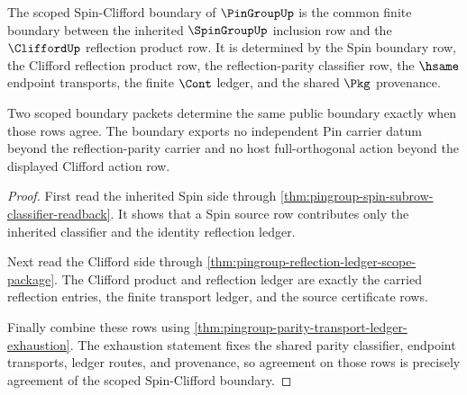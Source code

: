 \begin{theorem}
\label{thm:pingroup-scoped-spin-clifford-boundary}
The scoped Spin-Clifford boundary of $\PinGroupUp$ is the common finite
boundary between the inherited $\SpinGroupUp$ inclusion row and the
$\CliffordUp$ reflection product row. It is determined by the Spin boundary
row, the Clifford reflection product row, the reflection-parity classifier row,
the $\hsame$ endpoint transports, the finite $\Cont$ ledger, and the shared
$\Pkg$ provenance.

Two scoped boundary packets determine the same public boundary exactly when
those rows agree. The boundary exports no independent Pin carrier datum beyond
the reflection-parity carrier and no host full-orthogonal action beyond the
displayed Clifford action row.
\end{theorem}
\begin{proof}
First read the inherited Spin side through
\autoref{thm:pingroup-spin-subrow-classifier-readback}. It shows that a Spin
source row contributes only the inherited classifier and the identity
reflection ledger.

Next read the Clifford side through
\autoref{thm:pingroup-reflection-ledger-scope-package}. The Clifford product
and reflection ledger are exactly the carried reflection entries, the finite
transport ledger, and the source certificate rows.

Finally combine these rows using
\autoref{thm:pingroup-parity-transport-ledger-exhaustion}. The exhaustion
statement fixes the shared parity classifier, endpoint transports, ledger
routes, and provenance, so agreement on those rows is precisely agreement of
the scoped Spin-Clifford boundary.
\end{proof}

